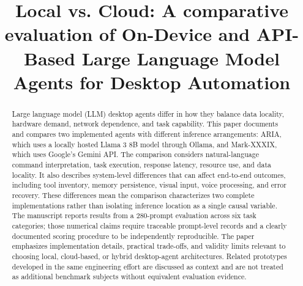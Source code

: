 \documentclass[conference]{IEEEtran}
\begin{document}
\title{Local vs. Cloud: A comparative evaluation of On-Device and API-Based Large Language Model Agents for Desktop Automation}

\author{
\and
{}
}

\maketitle

\begin{abstract}
Large language model (LLM) desktop agents differ in how they balance data locality, hardware demand, network dependence, and task capability. This paper documents and compares two implemented agents with different inference arrangements: ARIA, which uses a locally hosted Llama 3 8B model through Ollama, and Mark-XXXIX, which uses Google's Gemini API. The comparison considers natural-language command interpretation, task execution, response latency, resource use, and data locality. It also describes system-level differences that can affect end-to-end outcomes, including tool inventory, memory persistence, visual input, voice processing, and error recovery. These differences mean the comparison characterizes two complete implementations rather than isolating inference location as a single causal variable. The manuscript reports results from a 280-prompt evaluation across six task categories; those numerical claims require traceable prompt-level records and a clearly documented scoring procedure to be independently reproducible. The paper emphasizes implementation details, practical trade-offs, and validity limits relevant to choosing local, cloud-based, or hybrid desktop-agent architectures. Related prototypes developed in the same engineering effort are discussed as context and are not treated as additional benchmark subjects without equivalent evaluation evidence.
\end{abstract}
\end{document}
